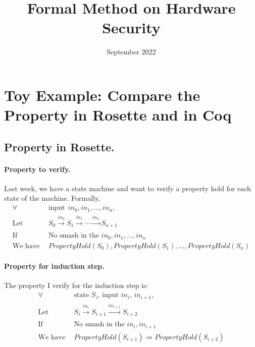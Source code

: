 \documentclass{article}
\title{Formal Method on Hardware Security}
\author{}
\date{September 2022}
\begin{document}
\maketitle










\section{Toy Example: Compare the Property in Rosette and in Coq}


\subsection{Property in Rosette.}

\paragraph{Property to verify.}
Last week, we have a state machine and want to verify a property hold for each state of the machine.
Formally,
\begin{align*}
\forall &~~ \text{input} ~~ in_0, in_1, \dots, in_n, \\
\text{Let} &~~ S_0 \xrightarrow[]{in_0} S_{1} \xrightarrow[]{in_1} \cdots \xrightarrow[]{in_n} S_{n+1} \\
\text{If} &~~ \text{No smash in the $in_0, in_1, \dots, in_n$} \\
\text{We have} &~~ PropertyHold(S_0), PropertyHold(S_1), \dots, PropertyHold(S_n)
\end{align*}




\paragraph{Property for induction step.}
The property I verify for the induction step is:
\begin{align*}
\forall &~~ \text{state $S_i$, input $in_i$, $in_{i+1}$}, \\
\text{Let} &~~ S_i \xrightarrow[]{in_i} S_{i+1} \xrightarrow[]{in_{i+1}} S_{i+2} \\
\text{If} &~~ \text{No smash in the $in_i, in_{i+1}$} \\
\text{We have} &~~ PropertyHold(S_{i+1}) \Rightarrow PropertyHold(S_{i+2})
\end{align*}
\end{document}
